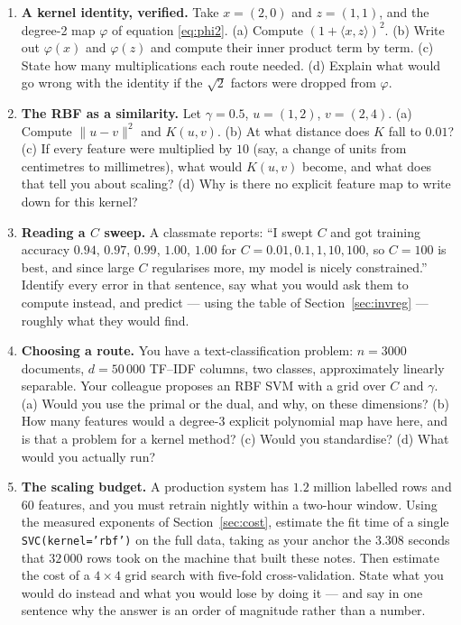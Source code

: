 \documentclass[11pt]{article}
\begin{document}
\begin{enumerate}[leftmargin=*]
  \item \textbf{A kernel identity, verified.} Take $x = (2,0)$ and
    $z = (1,1)$, and the degree-2 map $\varphi$ of equation \eqref{eq:phi2}.
    (a) Compute $(1 + \langle x, z\rangle)^2$. (b) Write out $\varphi(x)$ and
    $\varphi(z)$ and compute their inner product term by term. (c) State how
    many multiplications each route needed. (d) Explain what would go wrong
    with the identity if the $\sqrt2$ factors were dropped from $\varphi$.

  \item \textbf{The RBF as a similarity.} Let $\gamma = 0.5$, $u = (1,2)$,
    $v = (2,4)$. (a) Compute $\|u - v\|^2$ and $K(u,v)$. (b) At what distance
    does $K$ fall to $0.01$? (c) If every feature were multiplied by $10$
    (say, a change of units from centimetres to millimetres), what would
    $K(u,v)$ become, and what does that tell you about scaling? (d) Why is
    there no explicit feature map to write down for this kernel?

  \item \textbf{Reading a $C$ sweep.} A classmate reports: ``I swept $C$ and
    got training accuracy $0.94$, $0.97$, $0.99$, $1.00$, $1.00$ for
    $C = 0.01, 0.1, 1, 10, 100$, so $C = 100$ is best, and since large $C$
    regularises more, my model is nicely constrained.'' Identify every error
    in that sentence, say what you would ask them to compute instead, and
    predict --- using the table of Section~\ref{sec:invreg} --- roughly what
    they would find.

  \item \textbf{Choosing a route.} You have a text-classification problem:
    $n = 3000$ documents, $d = 50\,000$ TF--IDF columns, two classes,
    approximately linearly separable. Your colleague proposes an RBF SVM with a
    grid over $C$ and $\gamma$. (a) Would you use the primal or the dual, and
    why, on these dimensions? (b) How many features would a degree-3 explicit
    polynomial map have here, and is that a problem for a kernel method?
    (c) Would you standardise? (d) What would you actually run?

  \item \textbf{The scaling budget.} A production system has $1.2$ million
    labelled rows and $60$ features, and you must retrain nightly within a
    two-hour window. Using the measured exponents of Section~\ref{sec:cost},
    estimate the fit time of a single \texttt{SVC(kernel='rbf')} on the full
    data, taking as your anchor the $3.308$ seconds that $32\,000$ rows took
    on the machine that built these notes. Then estimate the cost of a
    $4 \times 4$ grid search with five-fold cross-validation. State what you
    would do instead and what you would lose by doing it --- and say in one
    sentence why the answer is an order of magnitude rather than a number.
\end{enumerate}
\end{document}
